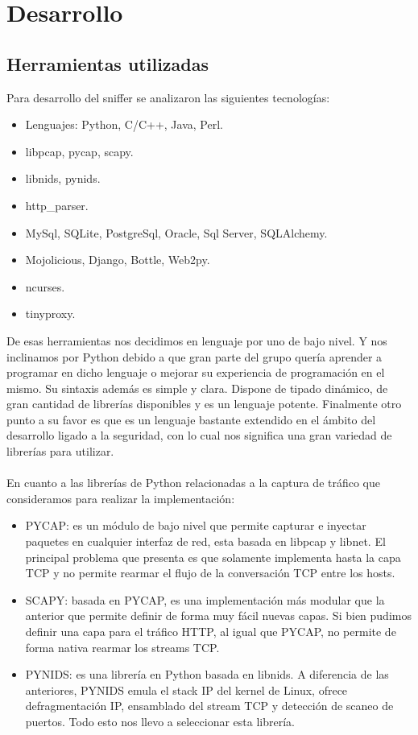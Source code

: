 \section{Desarrollo}

\subsection{Herramientas utilizadas}

Para desarrollo del sniffer se analizaron las siguientes tecnologías:

\begin{itemize}
	\item Lenguajes: Python, C/C++, Java, Perl.
	\item libpcap, pycap, scapy.
	\item libnids, pynids.
	\item http\_parser.
	\item MySql, SQLite, PostgreSql, Oracle, Sql Server, SQLAlchemy.
	\item Mojolicious, Django, Bottle, Web2py.
	\item ncurses.
	\item tinyproxy.
\end{itemize}

De esas herramientas nos decidimos en lenguaje por uno de bajo nivel. Y nos inclinamos por Python debido a que gran parte del grupo quería aprender a programar en dicho lenguaje o mejorar su experiencia de programación en el mismo. Su sintaxis además es simple y clara. Dispone de tipado dinámico, de gran cantidad de librerías disponibles y es un lenguaje potente. Finalmente otro punto a su favor es que es un lenguaje bastante extendido en el ámbito del desarrollo ligado a la seguridad, con lo cual nos significa una gran variedad de librerías para utilizar.
\\
\\\indent En cuanto a las librerías de Python relacionadas a la captura de tráfico que consideramos para realizar la implementación:

\begin{itemize}
\item PYCAP: es un módulo de bajo nivel que permite capturar e inyectar paquetes en cualquier interfaz de red, esta basada en libpcap y libnet. El principal problema que presenta es que solamente implementa hasta la capa TCP y no permite rearmar el flujo de la conversación TCP entre los hosts.
\item SCAPY: basada en PYCAP, es una implementación más modular que la anterior que permite definir de forma muy fácil nuevas capas. Si bien pudimos definir una capa para el tráfico HTTP, al igual que PYCAP, no permite de forma nativa rearmar los streams TCP.
\item PYNIDS: es una librería en Python basada en libnids. A diferencia de las anteriores, PYNIDS emula el stack IP del kernel de Linux, ofrece defragmentación IP, ensamblado del stream TCP y detección de scaneo de puertos. Todo esto nos llevo a seleccionar esta librería.
\end{itemize}

